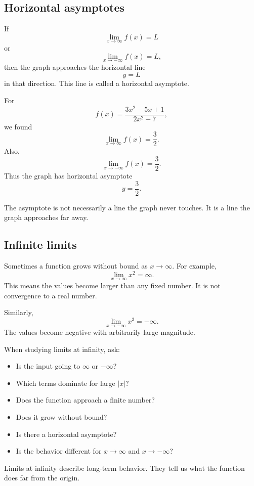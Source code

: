 \subsection*{Horizontal asymptotes}

If
\[
\lim_{x\to\infty}f(x)=L
\]
or
\[
\lim_{x\to-\infty}f(x)=L,
\]
then the graph approaches the horizontal line
\[
y=L
\]
in that direction. This line is called a horizontal asymptote.

\begin{examplebox}
For
\[
f(x)=\frac{3x^2-5x+1}{2x^2+7},
\]
we found
\[
\lim_{x\to\infty}f(x)=\frac32.
\]
Also,
\[
\lim_{x\to-\infty}f(x)=\frac32.
\]
Thus the graph has horizontal asymptote
\[
y=\frac32.
\]
\end{examplebox}

The asymptote is not necessarily a line the graph never touches. It is a line the graph approaches far away.

\subsection*{Infinite limits}

Sometimes a function grows without bound as \(x\to\infty\). For example,
\[
\lim_{x\to\infty}x^2=\infty.
\]
This means the values become larger than any fixed number. It is not convergence to a real number.

Similarly,
\[
\lim_{x\to-\infty}x^3=-\infty.
\]
The values become negative with arbitrarily large magnitude.

\begin{summarybox}
When studying limits at infinity, ask:
\begin{itemize}
\item Is the input going to \(\infty\) or \(-\infty\)?
\item Which terms dominate for large \(|x|\)?
\item Does the function approach a finite number?
\item Does it grow without bound?
\item Is there a horizontal asymptote?
\item Is the behavior different for \(x\to\infty\) and \(x\to-\infty\)?
\end{itemize}
\end{summarybox}

Limits at infinity describe long-term behavior. They tell us what the function does far from the origin.